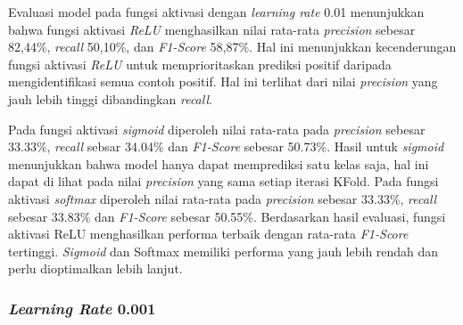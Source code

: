       Evaluasi model pada fungsi aktivasi dengan \textit{learning rate} 0.01 menunjukkan bahwa fungsi aktivasi \textit{ReLU} menghasilkan nilai rata-rata \textit{precision} sebesar 82,44\%, \textit{recall} 50,10\%, dan\textit{ F1-Score} 58,87\%. Hal ini menunjukkan kecenderungan fungsi aktivasi \textit{ReLU} untuk memprioritaskan prediksi positif daripada mengidentifikasi semua contoh positif. Hal ini terlihat dari nilai \textit{precision} yang jauh lebih tinggi dibandingkan \textit{recall}.

     Pada fungsi aktivasi \textit{sigmoid} diperoleh nilai rata-rata pada \textit{precision} sebesar 33.33\%, \textit{recall} sebsar 34.04\% dan\textit{ F1-Score} sebesar 50.73\%. Hasil untuk \textit{sigmoid} menunjukkan bahwa model hanya dapat memprediksi satu kelas saja, hal ini dapat di lihat pada nilai \textit{precision} yang sama setiap iterasi KFold. Pada fungsi aktivasi \textit{softmax} diperoleh nilai rata-rata pada \textit{precision} sebesar 33.33\%, \textit{recall} sebesar 33.83\% dan \textit{F1-Score} sebesar 50.55\%.
     Berdasarkan hasil evaluasi, fungsi aktivasi ReLU menghasilkan performa terbaik dengan rata-rata \textit{F1-Score} tertinggi. \textit{Sigmoid} dan Softmax memiliki performa yang jauh lebih rendah dan perlu dioptimalkan lebih lanjut.


 

    \subsubsection{\textit{Learning Rate} 0.001}
    
